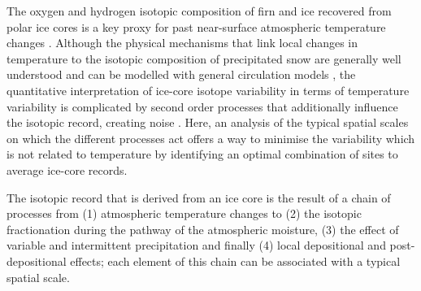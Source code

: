 \documentclass[cp, manuscript]{copernicus}
\begin{document}

\introduction

The oxygen and hydrogen isotopic composition of firn and ice recovered from
polar ice cores is a key proxy for past near-surface atmospheric temperature
changes \citep{Dansgaard1964,Lorius1969,Masson-Delmotte2008,Sjolte2011}.
Although the physical mechanisms that link local changes in temperature to the
isotopic composition of precipitated snow are generally well understood
\citep{Dansgaard1964,Craig1965,Jouzel1984} and can be modelled with general
circulation models
\citep{Joussaume1984,Werner2011,Werner2016,Sjolte2011,Goursaud2018}, the
quantitative interpretation of ice-core isotope variability in terms of
temperature variability is complicated by second order processes that
additionally influence the isotopic record, creating noise \citep{Munch2018a}.
Here, an analysis of the typical spatial scales on which the different processes
act offers a way to minimise the variability which is not related to temperature
by identifying an optimal combination of sites to average ice-core records.

The isotopic record that is derived from an ice core is the result of a chain of
processes from (1) atmospheric temperature changes to (2) the isotopic
fractionation during the pathway of the atmospheric moisture, (3) the effect of
variable and intermittent precipitation and finally (4) local depositional and
post-depositional effects; each element of this chain can be associated with a
typical spatial scale.
\end{document}
